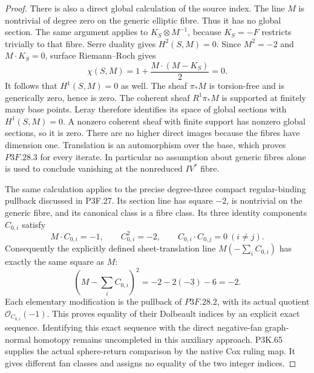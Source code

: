 \begin{proof}
There is also a direct global calculation of the source index. The line \(M\) is nontrivial of degree zero on the generic elliptic fibre. Thus it has no global section. The same argument applies to \(K_S\otimes M^{-1}\), because \(K_S=-F\) restricts trivially to that fibre. Serre duality gives \(H^2(S,M)=0\). Since \(M^2=-2\) and \(M\cdot K_S=0\), surface Riemann--Roch gives \[
 \chi(S,M)=1+\frac{M\cdot(M-K_S)}2=0.
\] It follows that \(H^1(S,M)=0\) as well. The sheaf \(\pi_*M\) is torsion-free and is generically zero, hence is zero. The coherent sheaf \(R^1\pi_*M\) is supported at finitely many base points. Leray therefore identifies its space of global sections with \(H^1(S,M)=0\). A nonzero coherent sheaf with finite support has nonzero global sections, so it is zero. There are no higher direct images because the fibres have dimension one. Translation is an automorphism over the base, which proves \(P3F.28.3\) for every iterate. In particular no assumption about generic fibres alone is used to conclude vanishing at the nonreduced \(IV^*\) fibre.

The same calculation applies to the precise degree-three compact regular-binding pullback discussed in P3F.27. Its section line has square \(-2\), is nontrivial on the generic fibre, and its canonical class is a fibre class. Its three identity components \(C_{0,i}\) satisfy \[
 M\cdot C_{0,i}=-1,\qquad C_{0,i}^2=-2,
 \qquad C_{0,i}\cdot C_{0,j}=0\ (i\ne j).
\] Consequently the explicitly defined sheet-translation line \(M(-\sum_iC_{0,i})\) has exactly the same square as \(M\): \[
 \left(M-\sum_iC_{0,i}\right)^2
 =-2-2(-3)-6=-2.
\] Each elementary modification is the pullback of \(P3F.28.2\), with its actual quotient \(\mathcal O_{C_{0,i}}(-1)\). This proves equality of their Dolbeault indices by an explicit exact sequence. Identifying this exact sequence with the direct negative-fan graph-normal homotopy remains uncompleted in this auxiliary approach. P3K.65 supplies the actual sphere-return comparison by the native Cox ruling map. It gives different fan classes and assigns no equality of the two integer indices.
\end{proof}
